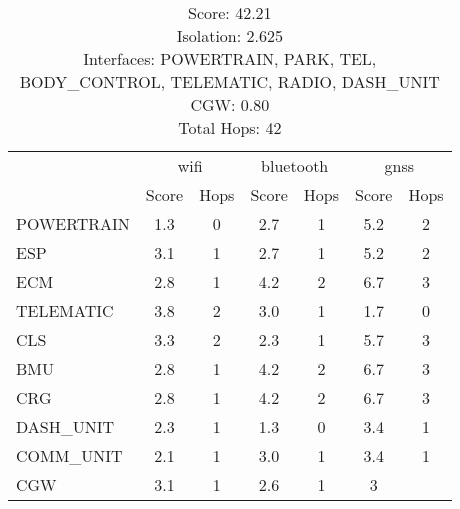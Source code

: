 \begin{table}[ht]
    \centering
    \caption{ \\ Score: 42.21 \\ Isolation: 2.625 \\ Interfaces: POWERTRAIN, PARK, TEL, BODY\_CONTROL, TELEMATIC, RADIO, DASH\_UNIT \\ CGW: 0.80 \\ Total Hops: 42}
    \label{tab:arch4}
    \begin{tabular}{lcccccc}
    \hline
        & \multicolumn{2}{c}{wifi} & \multicolumn{2}{c}{bluetooth} & \multicolumn{2}{c}{gnss} \\
        & Score & Hops & Score & Hops & Score & Hops \\
    \hline
    POWERTRAIN & 1.3 & 0 & 2.7 & 1 & 5.2 & 2 \\
    ESP & 3.1 & 1 & 2.7 & 1 & 5.2 & 2 \\
    ECM & 2.8 & 1 & 4.2 & 2 & 6.7 & 3 \\
    TELEMATIC & 3.8 & 2 & 3.0 & 1 & 1.7 & 0 \\
    CLS & 3.3 & 2 & 2.3 & 1 & 5.7 & 3 \\
    BMU & 2.8 & 1 & 4.2 & 2 & 6.7 & 3 \\
    CRG & 2.8 & 1 & 4.2 & 2 & 6.7 & 3 \\
    DASH\_UNIT & 2.3 & 1 & 1.3 & 0 & 3.4 & 1 \\
    COMM\_UNIT & 2.1 & 1 & 3.0 & 1 & 3.4 & 1 \\
    CGW & 3.1 & 1 & 2.6 & 1 & 3 \\
    \hline
    \end{tabular}
\end{table}    

\newpage

